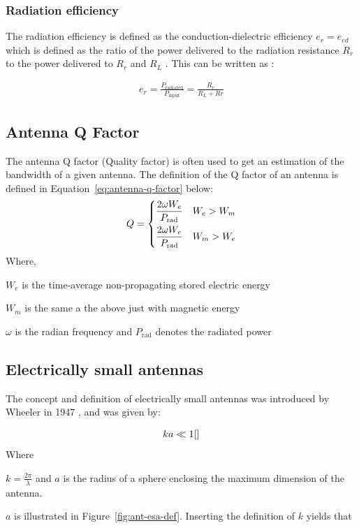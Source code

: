 \subsubsection{Radiation efficiency}
The radiation efficiency is defined as the conduction-dielectric efficiency $e_r = e_{ed}$ which is defined as the ratio of the power delivered to the radiation resistance $R_r$ to the power delivered to $R_r$ and $R_L$ \cite{}. This can be written as \cite{}:


\begin{align}
  e_r = \frac{P_{\text{radiated}}}{P_{\text{input}}} = \frac{R_r}{R_L+Rr}
\end{align}

\subsection{Antenna Q Factor}
The antenna Q factor (Quality factor) is often used to get an estimation of the bandwidth of a given antenna. The definition of the Q factor of an antenna is defined in Equation~\ref{eq:antenna-q-factor} below\cite{fundamentalMcLean}: 
\begin{align}
  \label{eq:antenna-q-factor}
      Q =
    \begin{dcases}
       \frac{2 \omega W_e}{P_{\text{rad}}} & W_e > W_m  \\
       \frac{2 \omega W_e}{P_{\text{rad}}} & W_m > W_e 
    \end{dcases}
\end{align}
Where, 
\begin{where}
\item[$W_e$] is the time-average non-propagating stored electric energy 
\item[$W_m$] is the same a the above just with magnetic energy 
\item[$\omega$] is the radian frequency and $P_{\text{rad}}$ denotes the radiated power
\end{where}

\subsection{Electrically small antennas}
The concept and definition of electrically small antennas was introduced by Wheeler in 1947 \cite{}, and was given by:

\begin{align}
\label{eq:esa-def}
  ka \ll 1 \cite{} 
\end{align}
Where 
\begin{where}
\item[$k = \frac{2\pi}{\lambda}$ and $a$] is the radius of a sphere enclosing the maximum dimension of the antenna. 
\end{where}
$a$ is illustrated in Figure~\ref{fig:ant-esa-def}. Inserting the definition of $k$ yields that \cite{}

